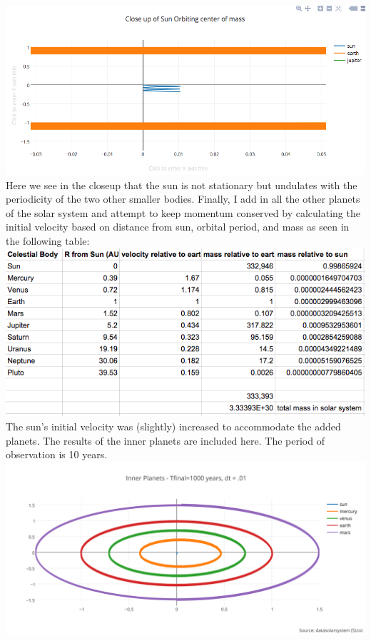 \documentclass[11pt,a4wide]{article}
\begin{document}
\begin{enumerate}
\includegraphics[width=6in]{sunorbit.png}\\
Here we see in the closeup that the sun is not stationary but undulates with the periodicity of the two other smaller bodies. \newline
Finally, I add in all the other planets of the solar system and attempt to keep momentum conserved by calculating the initial velocity based on distance from sun, orbital period, and mass as seen in the following table: 
\includegraphics[width=6in]{table.png}\\
The sun's initial velocity was (slightly) increased to accommodate the added planets. The results of the inner planets are included here. The period of observation is 10 years. 
\includegraphics[width=6in]{innerplanets.png}\\

\end{enumerate}
\end{document}
